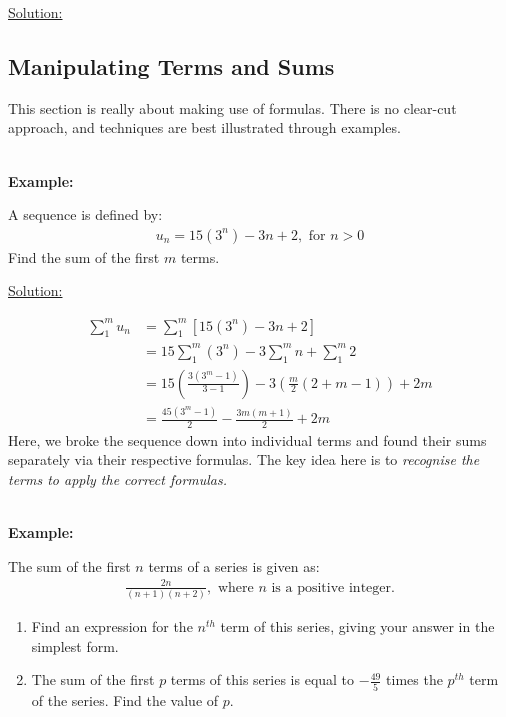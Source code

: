 \documentclass[12pt, a4paper, titlepage]{article}
\begin{document}
\underline{Solution:}

\subsection{Manipulating Terms and Sums}

This section is really about making use of formulas. There is no clear-cut approach, and techniques are best illustrated through examples.

\textbf{\\ Example:}

A sequence is defined by:
\begin{align*}
    u_n = 15(3^n) - 3n + 2, \text{ for } n > 0
\end{align*}
Find the sum of the first $m$ terms.

\begin{flushright}
\end{flushright}

\underline{Solution:}

\begin{align*}
    \sum_1^m u_n &= \sum_1^m [15(3^n) - 3n + 2] \\
    &= 15 \sum_1^m (3^n) - 3 \sum_1^m n + \sum_1^m 2 \\
    &= 15(\frac{3(3^m - 1)}{3 - 1}) - 3(\frac{m}{2}(2 + m - 1)) + 2m \\
    &= \frac{45(3^m - 1)}{2} - \frac{3m(m + 1)}{2} + 2m
\end{align*}
Here, we broke the sequence down into individual terms and found their sums separately via their respective formulas. The key idea here is to \emph{recognise the terms to apply the correct formulas.}

\textbf{\\ Example:}

The sum of the first $n$ terms of a series is given as:
\begin{align*}
    \frac{2n}{(n + 1)(n + 2)}, \text{ where } n \text{ is a positive integer.}
\end{align*}
\begin{enumerate}[label=(\alph*)]
    \item Find an expression for the $n^{th}$ term of this series, giving your answer in the simplest form.
    \item The sum of the first $p$ terms of this series is equal to $-\frac{49}{5}$ times the $p^{th}$ term of the series. Find the value of $p$.
\end{enumerate}
\end{document}
